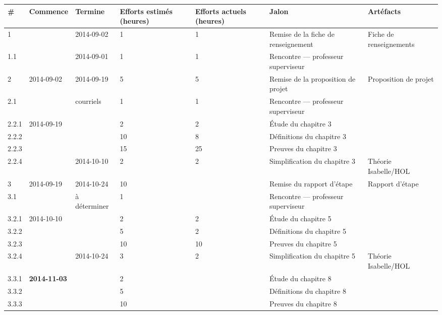 \documentclass[a4paper, oneside, 12pt, titlepage]{article}
\begin{document}
\begin{landscape}
\begin{table}[!h]
  \small
  \centering
  \begin{tabular}{|l||l|l|p{1.6cm}|p{1.6cm}||l|l|}
    \hline
    \textbf{\#} &
    \textbf{Commence} &
    \textbf{Termine} &
    \textbf{Efforts estimés (heures)} &
    \textbf{Efforts actuels (heures)} &
    \textbf{Jalon} &
    \textbf{Artéfacts} \\
    \hline \hline
    1   & & 2014-09-02 & 1 & 1 & Remise de la fiche de renseignement & Fiche de renseignements \\
    1.1 & & 2014-09-01 & 1 & 1 & Rencontre --- professeur superviseur & \\
    \hline
    2   & 2014-09-02 & 2014-09-19 & 5 & 5 & Remise de la proposition de projet & Proposition de projet \\
    2.1 &            & courriels  & 1 & 1 & Rencontre --- professeur superviseur & \\
    \hline
    2.2.1 & 2014-09-19 &            & 2  & 2  & Étude du chapitre 3 & \\
    2.2.2 &            &            & 10 & 8  & Définitions du chapitre 3 & \\
    2.2.3 &            &            & 15 & 25 & Preuves du chapitre 3 & \\
    2.2.4 &            & 2014-10-10 & 2  & 2  & Simplification du chapitre 3 & Théorie Isabelle/HOL \\
    \hline
    3   & 2014-09-19 & 2014-10-24   & 10 & & Remise du rapport d'étape & Rapport d'étape \\
    3.1 &            & à déterminer & 1  & & Rencontre --- professeur superviseur & \\
    \hline
    3.2.1 & 2014-10-10 &            & 2  & 2  & Étude du chapitre 5 & \\
    3.2.2 &            &            & 5  & 2  & Définitions du chapitre 5 & \\
    3.2.3 &            &            & 10 & 10 & Preuves du chapitre 5 & \\
    3.2.4 &            & 2014-10-24 & 3  & 2  & Simplification du chapitre 5 & Théorie Isabelle/HOL \\
    \hline
    3.3.1 & \textbf{2014-11-03} &                     & 2  & & Étude du chapitre 8 & \\
    3.3.2 &                     &                     & 5  & & Définitions du chapitre 8 & \\
    3.3.3 &                     &                     & 10 & & Preuves du chapitre 8 & \\

\end{tabular}
\end{table}
\end{landscape}
\end{document}
